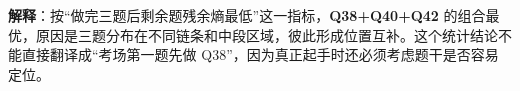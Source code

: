\textbf{解释}：按“做完三题后剩余题残余熵最低”这一指标，\textbf{Q38+Q40+Q42} 的组合最优，原因是三题分布在不同链条和中段区域，彼此形成位置互补。这个统计结论不能直接翻译成“考场第一题先做 Q38”，因为真正起手时还必须考虑题干是否容易定位。